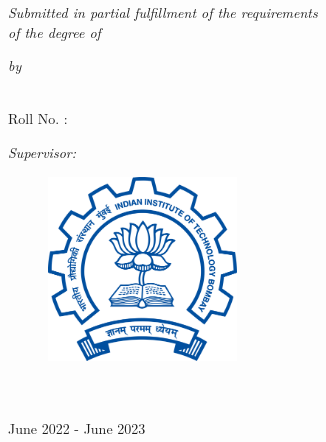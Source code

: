 
\begin{titlepage}
	\begin{center}
		
		{\huge \bfseries \ttitle\par}\vspace{0.05\textwidth} %
					
		\large \textit{Submitted in partial fulfillment of the requirements}
		\vspace{0.02\textwidth}
		\\ \large \textit{of the degree of}
		\vspace{0.05\textwidth}
		\\ \degreename
		
		\vspace{0.05\textwidth}
		\textit{by}
		
		\vspace{0.05\textwidth}
		\textbf{\authorname}
		\vspace{0.02\textwidth}
		\\ Roll No. : \matnumber
		
		\vspace{0.05\textwidth}
		\textit{Supervisor:}
		\vspace{0.02\textwidth}
		\\ \supname
		
		\vspace{0.1\textwidth}
		\begin{figure}[H]
			\centering
			\includegraphics[width=5cm]{Figures/iitb-logo}
		\end{figure}
		
		\vspace{0.1\textwidth}		
		\deptname
		\vspace{0.02\textwidth}
		\\ \univname
		\vspace{0.02\textwidth}
		\\ June 2022 - June 2023

	\end{center}
\end{titlepage}
